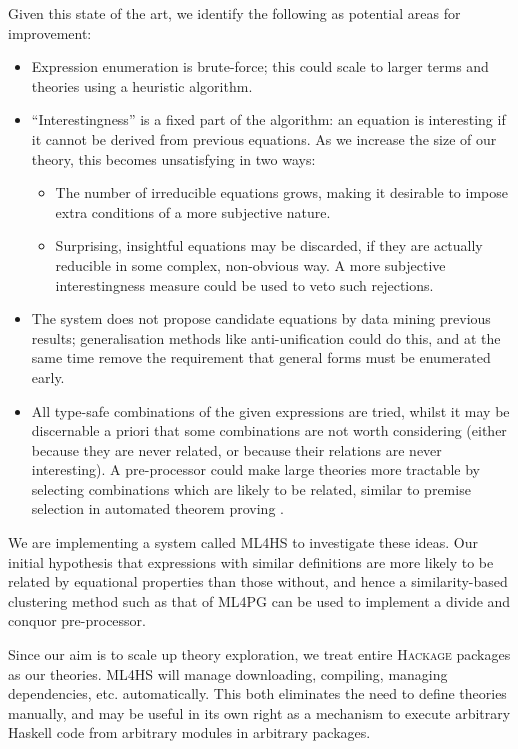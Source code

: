\documentclass{eceasst}
\begin{document}
Given this state of the art, we identify the following as potential
areas for improvement:

\begin{itemize}
\item
  Expression enumeration is brute-force; this could scale to larger
  terms and theories using a heuristic algorithm.
\item
  ``Interestingness'' is a fixed part of the algorithm: an equation is
  interesting if it cannot be derived from previous equations. As we
  increase the size of our theory, this becomes unsatisfying in two
  ways:

  \begin{itemize}
  \item
    The number of irreducible equations grows, making it desirable to
    impose extra conditions of a more subjective nature.
  \item
    Surprising, insightful equations may be discarded, if they are
    actually reducible in some complex, non-obvious way. A more
    subjective interestingness measure could be used to veto such
    rejections.
  \end{itemize}
\item
  The system does not propose candidate equations by data mining
  previous results; generalisation methods like anti-unification could
  do this, and at the same time remove the requirement that general
  forms must be enumerated early.
\item
  All type-safe combinations of the given expressions are tried, whilst
  it may be discernable a priori that some combinations are not worth
  considering (either because they are never related, or because their
  relations are never interesting). A pre-processor could make large
  theories more tractable by selecting combinations which are likely to
  be related, similar to premise selection in automated theorem proving
  \cite{kuhlwein2012overview}.
\end{itemize}

We are implementing a system called \textsc{ML4HS} to investigate these
ideas. Our initial hypothesis that expressions with similar definitions
are more likely to be related by equational properties than those
without, and hence a similarity-based clustering method such as that of
\textsc{ML4PG} \cite{journals/corr/abs-1302-6421} can be used to implement
a divide and conquor pre-processor.

Since our aim is to scale up theory exploration, we treat entire
\textsc{Hackage} packages as our theories. \textsc{ML4HS} will manage
downloading, compiling, managing dependencies, etc. automatically. This
both eliminates the need to define theories manually, and may be useful
in its own right as a mechanism to execute arbitrary Haskell code from
arbitrary modules in arbitrary packages.
\end{document}
